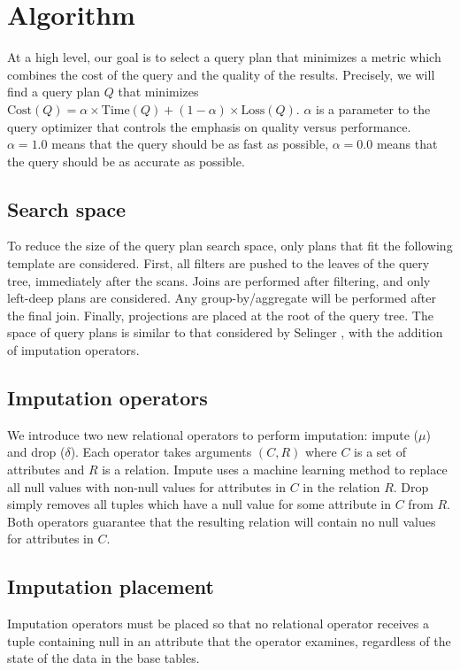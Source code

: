 \section{Algorithm}

At a high level, our goal is to select a query plan that minimizes a metric which combines the cost of the query and the quality of the results.
Precisely, we will find a query plan $Q$ that minimizes $\text{Cost}(Q) = \alpha \times \text{Time}(Q) + (1 - \alpha) \times \text{Loss}(Q)$. $\alpha$ is a parameter to the query optimizer that controls the emphasis on quality versus performance. $\alpha = 1.0$ means that the query should be as fast as possible, $\alpha=0.0$ means that the query should be as accurate as possible.

\subsection{Search space}
To reduce the size of the query plan search space, only plans that fit the following template are considered. First, all filters are pushed to the leaves of the query tree, immediately after the scans. Joins are performed after filtering, and only left-deep plans are considered. Any group-by/aggregate will be performed after the final join. Finally, projections are placed at the root of the query tree. The space of query plans is similar to that considered by Selinger , with the addition of imputation operators.

\subsection{Imputation operators}
We introduce two new relational operators to perform imputation: impute ($\mu$) and drop ($\delta$). Each operator takes arguments $(C, R)$ where $C$ is a set of attributes and $R$ is a relation. Impute uses a machine learning method to replace all null values with non-null values for attributes in $C$ in the relation $R$. Drop simply removes all tuples which have a null value for some attribute in $C$ from $R$. Both operators guarantee that the resulting relation will contain no null values for attributes in $C$. 

\subsection{Imputation placement}
\label{sec:placement}
Imputation operators must be placed so that no relational operator receives a tuple containing null in an attribute that the operator examines, regardless of the state of the data in the base tables.

